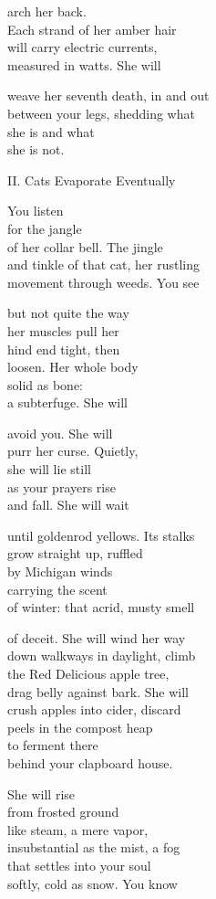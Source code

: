 \documentclass[twoside,10pt]{book}
\begin{document}
arch her back.\\
Each strand of her amber hair\\
will carry electric currents,\\
measured in watts. She will

weave her seventh death, in and out\\
between your legs, shedding what\\
she is and what\\
she is not.

II. Cats Evaporate Eventually

You listen\\
for the jangle\\
of her collar bell. The jingle\\
and tinkle of that cat, her rustling\\
movement through weeds. You see

but not quite the way\\
her muscles pull her\\
hind end tight, then\\
loosen. Her whole body\\
solid as bone:\\
a subterfuge. She will

avoid you. She will\\
purr her curse. Quietly,\\
she will lie still\\
as your prayers rise\\
and fall. She will wait

until goldenrod yellows. Its stalks\\
grow straight up, ruffled\\
by Michigan winds\\
carrying the scent\\
of winter: that acrid, musty smell

of deceit. She will wind her way\\
down walkways in daylight, climb\\
the Red Delicious apple tree,\\
drag belly against bark. She will\\
crush apples into cider, discard\\
peels in the compost heap\\
to ferment there\\
behind your clapboard house.

She will rise\\
from frosted ground\\
like steam, a mere vapor,\\
insubstantial as the mist, a fog\\
that settles into your soul\\
softly, cold as snow. You know
\end{document}
